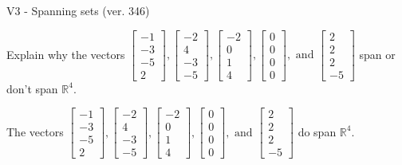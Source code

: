 \begin{exercise}
  \begin{exerciseTitle}V3 - Spanning sets (ver. 346)\end{exerciseTitle}
  \begin{exerciseStatement}
    Explain why the vectors \(\left[\begin{array}{r}
-1 \\
-3 \\
-5 \\
2
\end{array}\right] , \left[\begin{array}{r}
-2 \\
4 \\
-3 \\
-5
\end{array}\right] , \left[\begin{array}{r}
-2 \\
0 \\
1 \\
4
\end{array}\right] , \left[\begin{array}{r}
0 \\
0 \\
0 \\
0
\end{array}\right] , \text{ and } \left[\begin{array}{r}
2 \\
2 \\
2 \\
-5
\end{array}\right]\) span or don't span \(\mathbb{R}^4\). 
	


  \end{exerciseStatement}
  \begin{exerciseAnswer}
   The vectors \(\left[\begin{array}{r}
-1 \\
-3 \\
-5 \\
2
\end{array}\right] , \left[\begin{array}{r}
-2 \\
4 \\
-3 \\
-5
\end{array}\right] , \left[\begin{array}{r}
-2 \\
0 \\
1 \\
4
\end{array}\right] , \left[\begin{array}{r}
0 \\
0 \\
0 \\
0
\end{array}\right] , \text{ and } \left[\begin{array}{r}
2 \\
2 \\
2 \\
-5
\end{array}\right]\) 
  	 do  
	span \(\mathbb{R}^4\).
  



\end{exerciseAnswer}
\end{exercise}
